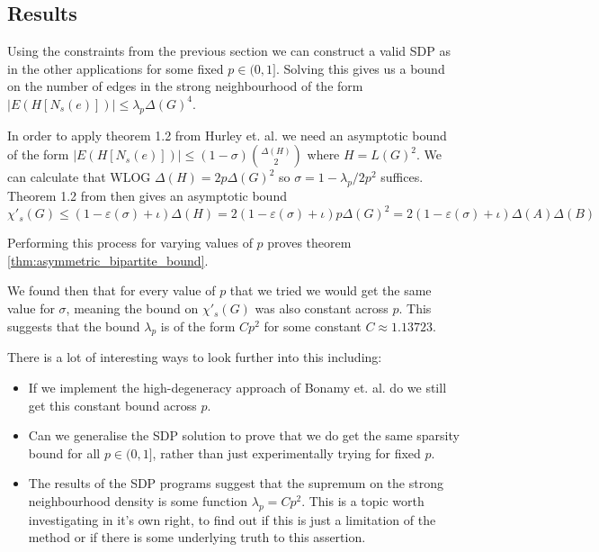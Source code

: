 \subsection{Results}
\label{sec:asymmetric_sec_results}

Using the constraints from the previous section we can construct a valid
SDP as in the other applications for some fixed $p\in (0, 1]$. Solving this
gives us a bound on the number of edges in the strong neighbourhood of the form
$|E(H[N_s(e)])| \leq \lambda_p \Delta(G)^4$.

In order to apply theorem 1.2 from Hurley et. al. \cite{hurleyImprovedProcedureColouring2022}
we need an asymptotic bound of the form $|E(H[N_s(e)])| \leq (1-\sigma)\binom{\Delta(H)}{2}$
where $H=L(G)^2$.
We can calculate that WLOG $\Delta(H)=2p\Delta(G)^2$ so $\sigma=1-\lambda_p/2p^2$
suffices. Theorem 1.2 from \cite{hurleyImprovedProcedureColouring2022} then gives
an asymptotic bound
\[
    \chi'_s(G) \leq (1-\varepsilon(\sigma)+\iota)\Delta(H)=2(1-\varepsilon(\sigma)+\iota)p\Delta(G)^2
    = 2(1-\varepsilon(\sigma)+\iota)\Delta(A)\Delta(B)
\]

Performing this process for varying values of $p$ proves
theorem \ref{thm:asymmetric_bipartite_bound}.

We found then that for every value of $p$ that we tried we would get the same
value for $\sigma$, meaning the bound on $\chi'_s(G)$ was also constant across
$p$. This suggests that the bound $\lambda_p$ is of the form $Cp^2$ for some
constant $C \approx 1.13723$.

There is a lot of interesting ways to look further into this including:
\begin{itemize}
    \item If we implement the high-degeneracy approach of Bonamy et. al. do we still get this
        constant bound across $p$.
    \item Can we generalise the SDP solution to prove that we do get the same sparsity
        bound for all $p\in (0, 1]$, rather than just experimentally trying for fixed $p$.
    \item The results of the SDP programs suggest that the supremum on the strong neighbourhood
        density is some function $\lambda_p=Cp^2$. This is a topic worth investigating in
        it's own right, to find out if this is just a limitation of the method or if there
        is some underlying truth to this assertion.
\end{itemize}
